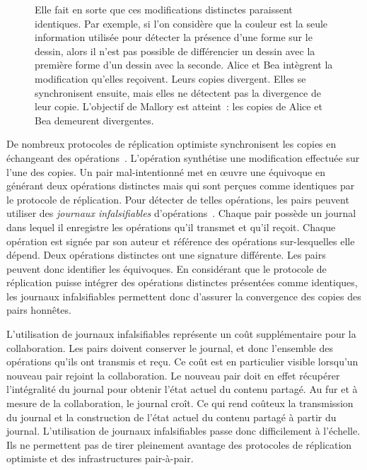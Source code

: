\begin{figure}[hbt]
{Elle fait en sorte que ces modifications distinctes paraissent identiques.
Par exemple, si l'on considère que la couleur est la seule information utilisée pour détecter la présence d'une forme sur le dessin, alors il n'est pas possible de différencier un dessin avec la première forme d'un dessin avec la seconde.
 Alice et Bea intègrent la modification qu'elles reçoivent.
Leurs copies divergent.
Elles se synchronisent ensuite, mais elles ne détectent pas la divergence de leur copie.
L'objectif de Mallory est atteint~: les copies de Alice et Bea demeurent divergentes.}\label{fig:equivocation-scenario}
\end{figure}

De nombreux protocoles de réplication optimiste synchronisent les copies en échangeant des opérations~\autocite{baquero_2018_pure-op-crdt}.
L'opération synthétise une modification effectuée sur l'une des copies.
Un pair mal-intentionné met en œuvre une équivoque en générant deux opérations distinctes mais qui sont perçues comme identiques par le protocole de réplication.
Pour détecter de telles opérations, les pairs peuvent utiliser des \emph{journaux infalsifiables} d'opérations~\autocite{li_2004_sundr,mahajan_depot_2011,truong_authenticating_2012}.
Chaque pair possède un journal dans lequel il enregistre les opérations qu'il transmet et qu'il reçoit.
Chaque opération est signée par son auteur et référence des opérations sur-lesquelles elle dépend.
Deux opérations distinctes ont une signature différente.
Les pairs peuvent donc identifier les équivoques.
En considérant que le protocole de réplication puisse intégrer des opérations distinctes présentées comme identiques, les journaux infalsifiables permettent donc d'assurer la convergence des copies des pairs honnêtes.

L'utilisation de journaux infalsifiables représente un coût supplémentaire pour la collaboration.
Les pairs doivent conserver le journal, et donc l'ensemble des opérations qu'ils ont transmis et reçu.
Ce coût est en particulier visible lorsqu'un nouveau pair rejoint la collaboration.
Le nouveau pair doit en effet récupérer l'intégralité du journal pour obtenir l'état actuel du contenu partagé.
Au fur et à mesure de la collaboration, le journal croît.
Ce qui rend coûteux la transmission du journal et la construction de l'état actuel du contenu partagé à partir du journal.
L'utilisation de journaux infalsifiables passe donc difficilement à l'échelle.
Ils ne permettent pas de tirer pleinement avantage des protocoles de réplication optimiste et des infrastructures pair-à-pair.

